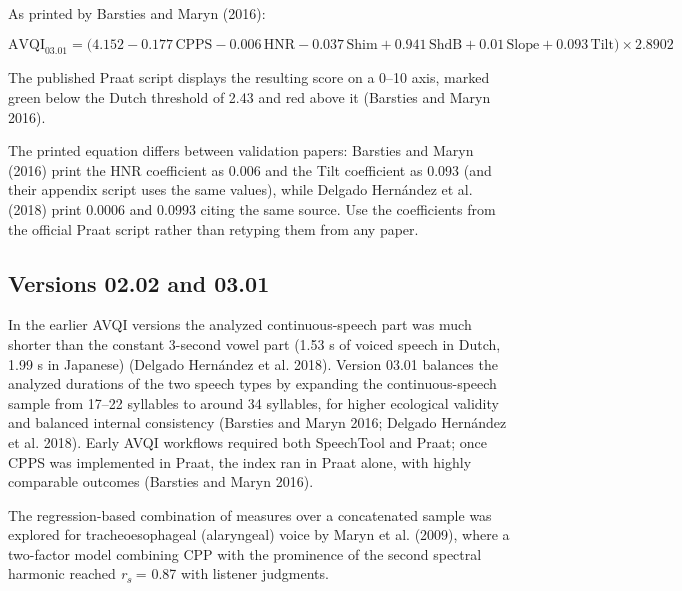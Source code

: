 \documentclass[
  english,
  letterpaper,
]{scrbook}
\begin{document}
As printed by Barsties and Maryn (2016):

\[
\text{AVQI}_{03.01} = \bigl(4.152 - 0.177\,\text{CPPS} - 0.006\,\text{HNR}
- 0.037\,\text{Shim} + 0.941\,\text{ShdB}
+ 0.01\,\text{Slope} + 0.093\,\text{Tilt}\bigr) \times 2.8902
\]

The published Praat script displays the resulting score on a 0--10 axis,
marked green below the Dutch threshold of 2.43 and red above it
(Barsties and Maryn 2016).

\begin{tcolorbox}[enhanced jigsaw, arc=.35mm, bottomrule=.15mm, bottomtitle=1mm, breakable, colback=white, colbacktitle=quarto-callout-warning-color!10!white, colframe=quarto-callout-warning-color-frame, coltitle=black, left=2mm, leftrule=.75mm, opacityback=0, opacitybacktitle=0.6, rightrule=.15mm, title=\textcolor{quarto-callout-warning-color}{\faExclamationTriangle}\hspace{0.5em}{Warning}, titlerule=0mm, toprule=.15mm, toptitle=1mm]

The printed equation differs between validation papers: Barsties and
Maryn (2016) print the HNR coefficient as 0.006 and the Tilt coefficient
as 0.093 (and their appendix script uses the same values), while Delgado
Hernández et al. (2018) print 0.0006 and 0.0993 citing the same source.
Use the coefficients from the official Praat script rather than retyping
them from any paper.

\end{tcolorbox}

\subsection{Versions 02.02 and 03.01}\label{versions-02.02-and-03.01}

In the earlier AVQI versions the analyzed continuous-speech part was
much shorter than the constant 3-second vowel part (1.53 s of voiced
speech in Dutch, 1.99 s in Japanese) (Delgado Hernández et al. 2018).
Version 03.01 balances the analyzed durations of the two speech types by
expanding the continuous-speech sample from 17--22 syllables to around
34 syllables, for higher ecological validity and balanced internal
consistency (Barsties and Maryn 2016; Delgado Hernández et al. 2018).
Early AVQI workflows required both SpeechTool and Praat; once CPPS was
implemented in Praat, the index ran in Praat alone, with highly
comparable outcomes (Barsties and Maryn 2016).

The regression-based combination of measures over a concatenated sample
was explored for tracheoesophageal (alaryngeal) voice by Maryn et al.
(2009), where a two-factor model combining CPP with the prominence of
the second spectral harmonic reached \emph{r\textsubscript{s}} = 0.87
with listener judgments.
\end{document}
